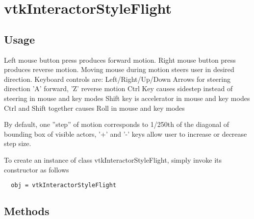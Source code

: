 \section{vtkInteractorStyleFlight}

\subsection{Usage}

 Left  mouse button press produces forward motion.
 Right mouse button press produces reverse motion.
 Moving mouse during motion steers user in desired direction.
 Keyboard controls are:
 Left/Right/Up/Down Arrows for steering direction
 'A' forward, 'Z' reverse motion
 Ctrl Key causes sidestep instead of steering in mouse and key modes
 Shift key is accelerator in mouse and key modes
 Ctrl and Shift together causes Roll in mouse and key modes

 By default, one ''step'' of motion corresponds to 1/250th of the diagonal
 of bounding box of visible actors, '+' and '-' keys allow user to
 increase or decrease step size.

To create an instance of class vtkInteractorStyleFlight, simply
invoke its constructor as follows
\begin{verbatim}
  obj = vtkInteractorStyleFlight
\end{verbatim}
\subsection{Methods}

